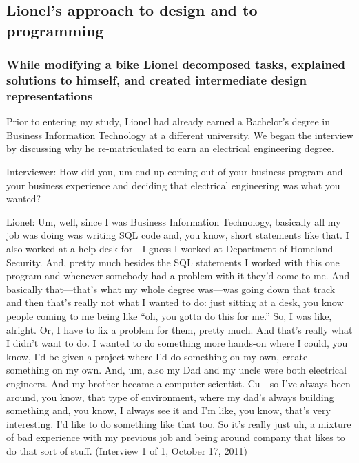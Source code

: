\subsection{\texorpdfstring{\protect\hypertarget{ux5fToc247188553}{}{\protect\hypertarget{ux5fToc252445926}{}{}}Lionel's
approach to design and to
programming}{Lionel's approach to design and to programming}}\label{lionels-approach-to-design-and-to-programming}

\subsubsection{While modifying a bike Lionel decomposed tasks, explained
solutions to himself, and created intermediate design
representations}\label{while-modifying-a-bike-lionel-decomposed-tasks-explained-solutions-to-himself-and-created-intermediate-design-representations}

Prior to entering my study, Lionel had already earned a Bachelor's
degree in Business Information Technology at a different university. We
began the interview by discussing why he re-matriculated to earn an
electrical engineering degree.

Interviewer: How did you, um end up coming out of your business program
and your business experience and deciding that electrical engineering
was what you wanted?

Lionel: Um, well, since I was Business Information Technology, basically
all my job was doing was writing SQL code and, you know, short
statements like that. I also worked at a help desk for---I guess I
worked at Department of Homeland Security. And, pretty much besides the
SQL statements I worked with this one program and whenever somebody had
a problem with it they'd come to me. And basically that---that's what my
whole degree was---was going down that track and then that's really not
what I wanted to do: just sitting at a desk, you know people coming to
me being like ``oh, you gotta do this for me.'' So, I was like, alright.
Or, I have to fix a problem for them, pretty much. And that's really
what I didn't want to do. I wanted to do something more hands-on where I
could, you know, I'd be given a project where I'd do something on my
own, create something on my own. And, um, also my Dad and my uncle were
both electrical engineers. And my brother became a computer scientist.
Cu---so I've always been around, you know, that type of environment,
where my dad's always building something and, you know, I always see it
and I'm like, you know, that's very interesting. I'd like to do
something like that too. So it's really just uh, a mixture of bad
experience with my previous job and being around company that likes to
do that sort of stuff. (Interview 1 of 1, October 17, 2011)

